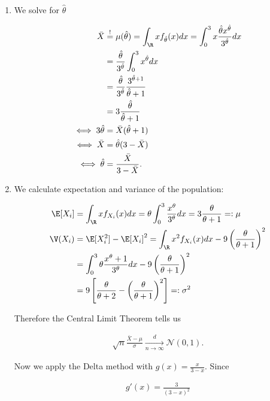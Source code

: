 \begin{solution}

\phantom{}

\begin{enumerate}[label=(\alph*)]
  \item We solve for $\hat{\theta}$

  \begin{align*}
    \bar{X} &\stackrel{!}{=} \mu(\hat{\theta}) = \int_\R x f_{\hat{\theta}}(x) dx
    = \int_0^3 x \frac{\hat{\theta} x^{\hat{\theta}}}{3^{\hat{\theta}}} dx \\
    &= \frac{\hat{\theta}}{3^{\hat{\theta}}} \int_0^3 x^{\hat{\theta}} dx \\
    &= \frac{\hat{\theta}}{3^{\hat{\theta}}} \frac{3^{\hat{\theta} + 1}}{\hat{\theta} + 1} \\
    &= 3\frac{\hat{\theta}}{\hat{\theta} + 1} \\
    \iff 3\hat{\theta} &= \bar{X}(\hat{\theta} + 1) \\
    \iff \bar{X} &= \hat{\theta}(3 - \bar{X}) \\
    \iff \hat{\theta} &= \frac{\bar{X}}{3 - \bar{X}}. \\
  \end{align*}
  \item We calculate expectation and variance of the population:

  \begin{align*}
    \E[X_i] &= \int_\R x f_{X_i}(x) dx = \theta \int_0^3 \frac{x^\theta}{3^\theta} dx
    = 3\frac{\theta}{\theta + 1} =: \mu \\
    \V(X_i) &= \E[X_i^2] - \E[X_i]^2 = \int_\R x^2 f_{X_i}(x) dx -
    9\left(\frac{\theta}{\theta + 1}\right)^2 \\
    &= \int_0^3\theta \frac{x^\theta + 1}{3^\theta} dx - 9\left(\frac{\theta}{\theta + 1}\right)^2 \\
    &= 9\left[\frac{\theta}{\theta + 2} -\left(\frac{\theta}{\theta + 1}\right)^2\right] =: \sigma^2
  \end{align*}

  Therefore the Central Limit Theorem tells us

  \begin{align*}
    \sqrt{n}\frac{\bar{X} - \mu}{\sigma} \xrightarrow[n \to \infty]{d}
    \mathcal{N}(0, 1).
  \end{align*}

  Now we apply the Delta method with $g(x) = \frac{x}{3 - x}$. Since

  \begin{align*}
    g'(x) = \frac{3}{(3-x)^2}
  \end{align*}


\end{enumerate}
\end{solution}
